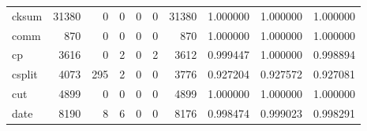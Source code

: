 \begin{longtable}{lrrrrrrrrr}
cksum     &                                              31380 &                                                  0 &                                                  0 &                                                  0 &                                                  0 &                                              31380 &                                           1.000000 &                               1.000000 &                             1.000000 \\
comm      &                                                870 &                                                  0 &                                                  0 &                                                  0 &                                                  0 &                                                870 &                                           1.000000 &                               1.000000 &                             1.000000 \\
cp        &                                               3616 &                                                  0 &                                                  2 &                                                  0 &                                                  2 &                                               3612 &                                           0.999447 &                               1.000000 &                             0.998894 \\
csplit    &                                               4073 &                                                295 &                                                  2 &                                                  0 &                                                  0 &                                               3776 &                                           0.927204 &                               0.927572 &                             0.927081 \\
cut       &                                               4899 &                                                  0 &                                                  0 &                                                  0 &                                                  0 &                                               4899 &                                           1.000000 &                               1.000000 &                             1.000000 \\
date      &                                               8190 &                                                  8 &                                                  6 &                                                  0 &                                                  0 &                                               8176 &                                           0.998474 &                               0.999023 &                             0.998291 \\

\end{longtable}
